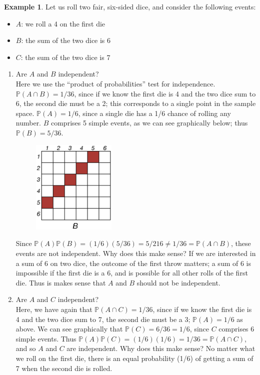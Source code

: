 \documentclass[12pt]{article}
\theoremstyle{definition}
\newtheorem*{example}{Example}
\theoremstyle{remark}
\def\P{{\mathbb P}}
\begin{document}
\begin{example}
Let us roll two fair, six-sided dice, and consider the following events:
\begin{itemize}
\item $A$: we roll a 4 on the first die
\item $B$: the sum of the two dice is 6
\item $C$: the sum of the two dice is 7
\end{itemize}
\begin{enumerate}
\item Are $A$ and $B$ independent? \\

Here we use the ``product of probabilities'' test for independence. $\P(A \cap B) = 1/36$, since if we know the first die is 4 and the two dice sum to 6, the second die must be a 2; this corresponds to a single point in the sample space. $\P(A) = 1/6$, since a single die has a 1/6 chance of rolling any number. $B$ comprises 5 simple events, as we can see graphically below; thus $\P(B) = 5/36$. 
\begin{figure}[H]
\centering
\includegraphics[width=4cm]{2dice2.eps}
\end{figure}
Since $\P(A)\P(B) = (1/6)(5/36) = 5/216 \neq 1/36 = \P(A \cap B)$, these events are not independent. Why does this make sense? If we are interested in a sum of 6 on two dice, the outcome of the first throw matters; a sum of 6 is impossible if the first die is a 6, and is possible for all other rolls of the first die. Thus is makes sense that $A$ and $B$ should not be independent.

\item Are $A$ and $C$ independent? \\

Here, we have again that $\P(A \cap C) = 1/36$, since if we know the first die is 4 and the two dice sum to 7, the second die must be a 3; $\P(A) = 1/6$ as above. We can see graphically that $\P(C) = 6/36 = 1/6$, since $C$ comprises 6 simple events. Thus $\P(A)\P(C) = (1/6)(1/6) = 1/36 = \P(A \cap C)$, and so $A$ and $C$ are independent. Why does this make sense? No matter what we roll on the first die, there is an equal probability (1/6) of getting a sum of 7 when the second die is rolled.
\end{enumerate}
\end{example}
\end{document}
